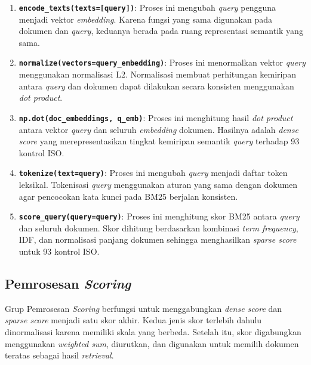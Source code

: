 \documentclass[12pt,a4paper]{article}
\begin{document}
\begin{enumerate}[label=\alph*., leftmargin=1.1cm]
\item \textbf{\texttt{encode\_texts(texts=[query])}}: Proses ini mengubah \textit{query} pengguna menjadi vektor \textit{embedding}. Karena fungsi yang sama digunakan pada dokumen dan \textit{query}, keduanya berada pada ruang representasi semantik yang sama.

\item \textbf{\texttt{normalize(vectors=query\_embedding)}}: Proses ini menormalkan vektor \textit{query} menggunakan normalisasi L2. Normalisasi membuat perhitungan kemiripan antara \textit{query} dan dokumen dapat dilakukan secara konsisten menggunakan \textit{dot product}.

\item \textbf{\texttt{np.dot(doc\_embeddings, q\_emb)}}: Proses ini menghitung hasil \textit{dot product} antara vektor \textit{query} dan seluruh \textit{embedding} dokumen. Hasilnya adalah \textit{dense score} yang merepresentasikan tingkat kemiripan semantik \textit{query} terhadap 93 kontrol ISO.

\item \textbf{\texttt{tokenize(text=query)}}: Proses ini mengubah \textit{query} menjadi daftar token leksikal. Tokenisasi \textit{query} menggunakan aturan yang sama dengan dokumen agar pencocokan kata kunci pada BM25 berjalan konsisten.

\item \textbf{\texttt{score\_query(query=query)}}: Proses ini menghitung skor BM25 antara \textit{query} dan seluruh dokumen. Skor dihitung berdasarkan kombinasi \textit{term frequency}, IDF, dan normalisasi panjang dokumen sehingga menghasilkan \textit{sparse score} untuk 93 kontrol ISO.
\end{enumerate}

\subsection*{Pemrosesan \textit{Scoring}}

Grup Pemrosesan \textit{Scoring} berfungsi untuk menggabungkan \textit{dense score} dan \textit{sparse score} menjadi satu skor akhir. Kedua jenis skor terlebih dahulu dinormalisasi karena memiliki skala yang berbeda. Setelah itu, skor digabungkan menggunakan \textit{weighted sum}, diurutkan, dan digunakan untuk memilih dokumen teratas sebagai hasil \textit{retrieval}.
\end{document}
